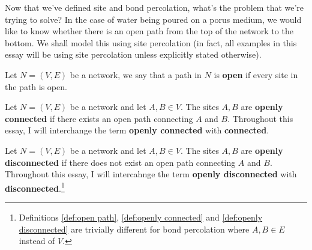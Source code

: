 

Now that we've defined site and bond percolation, what's the problem that we're trying to solve? In the case of water being poured on a porus medium, we would like to know
whether there is an open path from the top of the network to the bottom. We shall model this using site percolation (in fact, all examples in this essay will be using site
percolation unless explicitly stated otherwise).

\begin{definition}\label{def:open path}
  Let $N = (V, E)$ be a network, we say that a path in $N$ is \textbf{open} if every site in the path is open.
\end{definition}

\begin{definition}\label{def:openly connected}
  Let $N=(V, E)$ be a network and let $A, B \in V$. The sites $A, B$ are \textbf{openly connected} if there exists an open path connecting $A$ and $B$. Throughout this essay, I
  will interchange the term \textbf{openly connected} with \textbf{connected}.
\end{definition}

\begin{definition}\label{def:openly disconnected}
  Let $N=(V, E)$ be a network and let $A, B \in V$. The sites $A, B$ are \textbf{openly disconnected} if there does not exist an open path connecting $A$ and
  $B$. Throughout this essay, I will intercahnge the term \textbf{openly disconnected} with \textbf{disconnected}.\footnote{Definitions \ref{def:open path}, \ref{def:openly
  connected} and \ref{def:openly disconnected} are trivially different for bond percolation where $A, B \in E$ instead of $V$.}
\end{definition}

